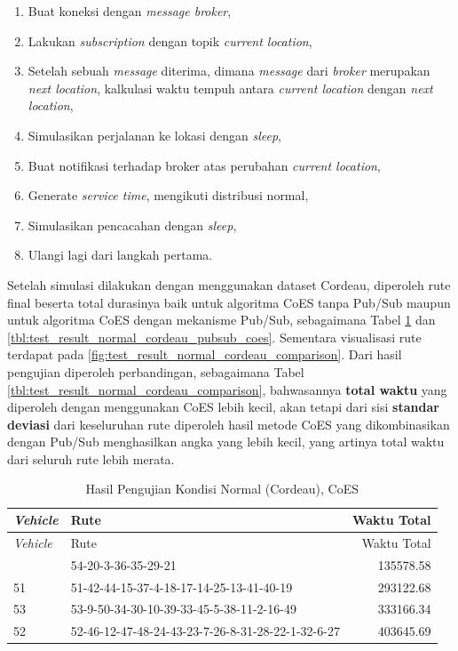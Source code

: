 \begin{enumerate}
\item Buat koneksi dengan \textit{message broker}, 
\item Lakukan \textit{subscription} dengan topik \textit{current location}, 
\item Setelah sebuah \textit{message} diterima, dimana \textit{message} dari \textit{broker} merupakan \textit{next location}, kalkulasi waktu tempuh antara \textit{current location} dengan \textit{next location},
\item Simulasikan perjalanan ke lokasi dengan \textit{sleep},
\item Buat notifikasi terhadap broker atas perubahan \textit{current location}, 
\item Generate \textit{service time}, mengikuti distribusi normal, 
\item Simulasikan pencacahan dengan \textit{sleep}, 
\item Ulangi lagi dari langkah pertama.
\end{enumerate}


Setelah simulasi dilakukan dengan menggunakan dataset Cordeau, diperoleh rute final beserta total durasinya baik untuk algoritma CoES tanpa Pub/Sub maupun untuk algoritma CoES dengan mekanisme Pub/Sub, sebagaimana Tabel \ref{tbl:test_result_normal_cordeau_coes} dan \ref{tbl:test_result_normal_cordeau_pubsub_coes}. Sementara visualisasi rute terdapat pada \autoref{fig:test_result_normal_cordeau_comparison}. Dari hasil pengujian diperoleh perbandingan, sebagaimana Tabel \ref{tbl:test_result_normal_cordeau_comparison}, bahwasannya \textbf{total waktu} yang diperoleh dengan menggunakan CoES lebih kecil, akan tetapi dari sisi \textbf{standar deviasi} dari keseluruhan rute diperoleh hasil metode CoES yang dikombinasikan dengan Pub/Sub menghasilkan angka yang lebih kecil, yang artinya total waktu dari seluruh rute lebih merata.


\begin{longtable}[!]{lp{8cm}r}
	\caption{Hasil Pengujian Kondisi Normal (Cordeau), CoES}
	\label{tbl:test_result_normal_cordeau_coes}\\
	\toprule
		\textit{Vehicle} & Rute & Waktu Total\\ 
	\midrule
	\endfirsthead
	\toprule
		\textit{Vehicle} & Rute & Waktu Total\\ 
	\midrule
	\endhead
	\bottomrule
	\endfoot
		54 & 54-20-3-36-35-29-21 & 135578.58 \\
		51 & 51-42-44-15-37-4-18-17-14-25-13-41-40-19 & 293122.68 \\
		53 & 53-9-50-34-30-10-39-33-45-5-38-11-2-16-49 & 333166.34 \\
		52 & 52-46-12-47-48-24-43-23-7-26-8-31-28-22-1-32-6-27 & 403645.69 \\
\end{longtable}


